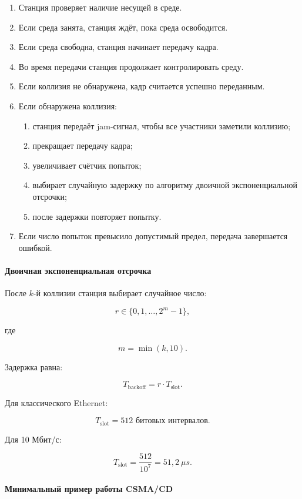 \documentclass[12pt,a4paper]{article}
\begin{document}
\begin{enumerate}
    \item Станция проверяет наличие несущей в среде.
    \item Если среда занята, станция ждёт, пока среда освободится.
    \item Если среда свободна, станция начинает передачу кадра.
    \item Во время передачи станция продолжает контролировать среду.
    \item Если коллизия не обнаружена, кадр считается успешно переданным.
    \item Если обнаружена коллизия:
    \begin{enumerate}
        \item станция передаёт jam-сигнал, чтобы все участники заметили коллизию;
        \item прекращает передачу кадра;
        \item увеличивает счётчик попыток;
        \item выбирает случайную задержку по алгоритму двоичной экспоненциальной отсрочки;
        \item после задержки повторяет попытку.
    \end{enumerate}
    \item Если число попыток превысило допустимый предел, передача завершается ошибкой.
\end{enumerate}

\paragraph{Двоичная экспоненциальная отсрочка}

После $k$-й коллизии станция выбирает случайное число:

\[
r \in \{0,1,\ldots,2^m - 1\},
\]

где

\[
m = \min(k, 10).
\]

Задержка равна:

\[
T_{\text{backoff}} = r \cdot T_{\text{slot}}.
\]

Для классического Ethernet:

\[
T_{\text{slot}} = 512 \text{ битовых интервалов}.
\]

Для 10 Мбит/с:

\[
T_{\text{slot}} = \frac{512}{10^7} = 51{,}2 \ \mu s.
\]

\paragraph{Минимальный пример работы CSMA/CD}
\end{document}
